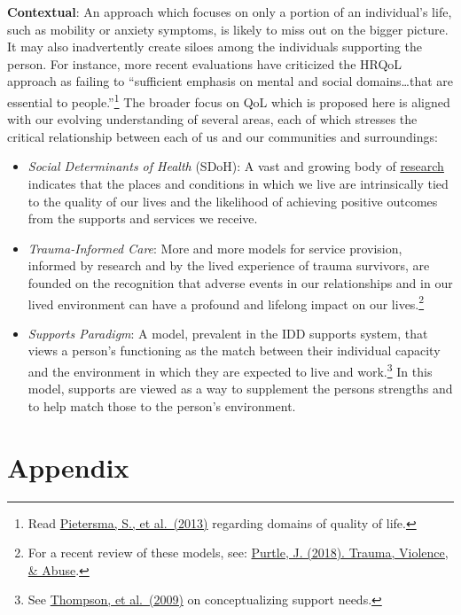 \documentclass[
]{book}
\providecommand{\tightlist}{%
  \setlength{\itemsep}{0pt}\setlength{\parskip}{0pt}}
\begin{document}
\textbf{Contextual}: An approach which focuses on only a portion of an individual's life, such as mobility or anxiety symptoms, is likely to miss out on the bigger picture. It may also inadvertently create siloes among the individuals supporting the person. For instance, more recent evaluations have criticized the HRQoL approach as failing to ``sufficient emphasis on mental and social domains\ldots{}that are essential to people.''\footnote{Read \href{https://www.ncbi.nlm.nih.gov/pmc/articles/PMC4031380/}{Pietersma, S., et al.~(2013)} regarding domains of quality of life.} The broader focus on QoL which is proposed here is aligned with our evolving understanding of several areas, each of which stresses the critical relationship between each of us and our communities and surroundings:

\begin{itemize}
\tightlist
\item
  \emph{Social Determinants of Health} (SDoH): A vast and growing body of \href{https://www.cdc.gov/socialdeterminants/research/index.htm}{research} indicates that the places and conditions in which we live are intrinsically tied to the quality of our lives and the likelihood of achieving positive outcomes from the supports and services we receive.
\item
  \emph{Trauma-Informed Care}: More and more models for service provision, informed by research and by the lived experience of trauma survivors, are founded on the recognition that adverse events in our relationships and in our lived environment can have a profound and lifelong impact on our lives.\footnote{For a recent review of these models, see: \href{https://www.ncbi.nlm.nih.gov/pubmed/30079827}{Purtle, J. (2018). Trauma, Violence, \& Abuse}.}
\item
  \emph{Supports Paradigm}: A model, prevalent in the IDD supports system, that views a person's functioning as the match between their individual capacity and the environment in which they are expected to live and work.\footnote{See \href{https://www.ncbi.nlm.nih.gov/pubmed/19368481}{Thompson, et al.~(2009)} on conceptualizing support needs.} In this model, supports are viewed as a way to supplement the persons strengths and to help match those to the person's environment.
\end{itemize}

\hypertarget{appendix}{%
\chapter{Appendix}\label{appendix}}
\end{document}
